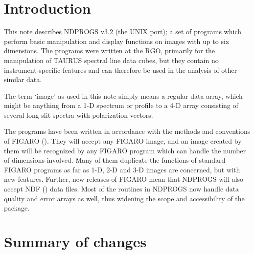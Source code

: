 \stardocabstract
 \newpage
 \begin{latexonly}
   \setlength{\parskip}{0mm}
   \latexonlytoc
   \setlength{\parskip}{\medskipamount}
   \markright{\stardocname}
 \end{latexonly}
\cleardoublepage

\renewcommand{\thepage}{\arabic{page}}
\setcounter{page}{1}

\section{Introduction{}}
\label{sec:introduction}

This note describes NDPROGS v3.2 (the UNIX port); a set of programs which
perform basic
manipulation and display functions on images with up to six dimensions.
The programs were written at the RGO, primarily for the
manipulation of TAURUS spectral line data cubes, but they contain
no instrument-specific features and can therefore be used in the
analysis of other similar data.

The term `image' as used in this note simply means a regular data
array, which might be anything from a 1-D spectrum or profile to a 4-D
array consisting of several long-slit spectra with polarization
vectors.

The programs have been written in accordance with the methods and
conventions of FIGARO (). They will accept any
FIGARO image, and
an image created by them will be recognized by any FIGARO program which
can handle the number of dimensions involved. Many of them duplicate
the functions of standard FIGARO programs as far as 1-D, 2-D and 3-D
images are concerned, but with new features. Further, new releases of
FIGARO mean that NDPROGS will also accept NDF () data files. Most of the
routines in NDPROGS now handle data quality and error arrays as well,
thus widening the scope and accessibility of the package.

\section{Summary of changes{}}
\label{sec:summary}

